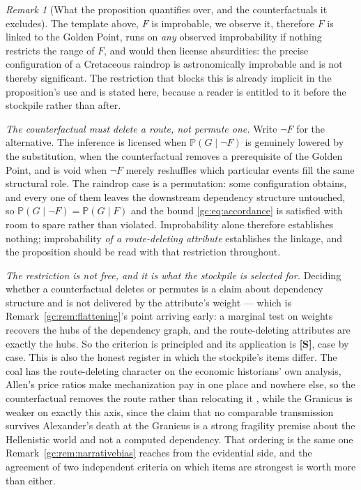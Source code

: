 \documentclass[11pt]{article}
\numberwithin{equation}{section}
\theoremstyle{plain}
\theoremstyle{definition}
\theoremstyle{remark}
\newtheorem{remark}[theorem]{Remark}
\newcommand{\PP}{\mathbb{P}}
\begin{document}
\begin{remark}[What the proposition quantifies over, and the
counterfactuals it excludes]\label{gc:rem:flukescope}
The template above, $F$ is improbable, we observe it, therefore $F$
is linked to the Golden Point, runs on \emph{any} observed
improbability if nothing restricts the range of $F$, and would then
license absurdities: the precise configuration of a Cretaceous
raindrop is astronomically improbable and is not thereby significant.
The restriction that blocks this is already implicit in the
proposition's use and is stated here, because a reader is entitled to
it before the stockpile rather than after.

\emph{The counterfactual must delete a route, not permute one.} Write
$\neg F$ for the alternative. The inference is licensed when
$\PP(G\mid\neg F)$ is genuinely lowered by the substitution, when
the counterfactual removes a prerequisite of the Golden Point, and
is void when $\neg F$ merely reshuffles which particular events fill
the same structural role. The raindrop case is a permutation: some
configuration obtains, and every one of them leaves the downstream
dependency structure untouched, so $\PP(G\mid\neg F)=\PP(G\mid F)$ and
the bound \eqref{gc:eq:accordance} is satisfied with room to spare
rather than violated. Improbability alone therefore establishes
nothing; improbability \emph{of a route-deleting attribute}
establishes the linkage, and the proposition should be read with that
restriction throughout.

\emph{The restriction is not free, and it is what the stockpile is
selected for.} Deciding whether a counterfactual deletes or permutes
is a claim about dependency structure and is not delivered by the
attribute's weight --- which is
Remark~\ref{gc:rem:flattening}'s point arriving early: a marginal test
on weights recovers the hubs of the dependency graph, and the
route-deleting attributes are exactly the hubs. So the criterion is
principled and its application is \textbf{[S]}, case by case. This is
also the honest register in which the stockpile's items differ. The
coal has the route-deleting character on the economic historians' own
analysis, Allen's price ratios make mechanization pay in one place
and nowhere else, so the counterfactual removes the route rather than
relocating it \cite{Allen09}, while the Granicus is weaker on
exactly this axis, since the claim that no comparable transmission
survives Alexander's death at the Granicus is a strong fragility
premise about the Hellenistic world and not a computed dependency.
That ordering is the same one Remark~\ref{gc:rem:narrativebias} reaches
from the evidential side, and the agreement of two independent
criteria on which items are strongest is worth more than either.
\end{remark}
\end{document}
